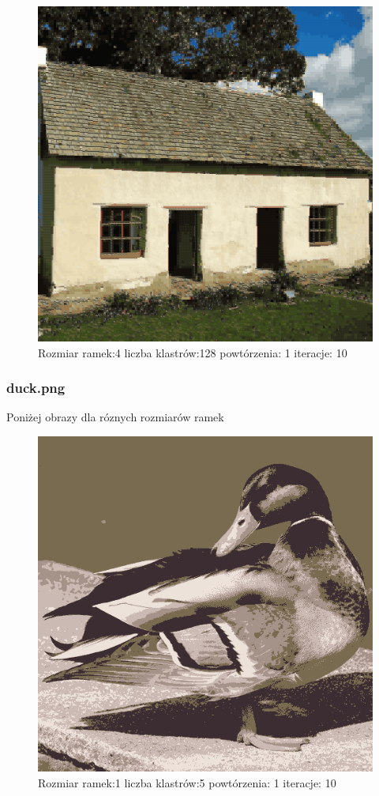 \documentclass{classrep}
\begin{document}
{{{{\begin{figure}[!htbp]
\centering
\includegraphics[width=\textwidth,width=90mm]{obrazy/house_R4_K128_P1_It10.png}
\caption{Rozmiar ramek:4 liczba klastrów:128 powtórzenia: 1 iteracje: 10 }
\end{figure}
\FloatBarrier
}

\subsubsection{duck.png}
{
Poniżej obrazy dla róznych rozmiarów ramek
\begin{figure}[!htbp]
\centering
\includegraphics[width=\textwidth,width=90mm]{obrazy/duck_R1_K5_P1_It10.png}
\caption{Rozmiar ramek:1 liczba klastrów:5 powtórzenia: 1 iteracje: 10 }
\end{figure}

}}}}
\end{document}
